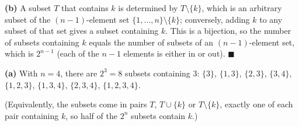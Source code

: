 \textbf{(b)} A subset $T$ that contains $k$ is determined by $T\setminus\{k\}$, which is an arbitrary subset of the $(n-1)$-element set $\{1,\ldots,n\}\setminus\{k\}$; conversely, adding $k$ to any subset of that set gives a subset containing $k$. This is a bijection, so the number of subsets containing $k$ equals the number of subsets of an $(n-1)$-element set, which is $2^{n-1}$ (each of the $n-1$ elements is either in or out). $\blacksquare$

\textbf{(a)} With $n=4$, there are $2^3=\boxed{8}$ subsets containing $3$: $\{3\}$, $\{1,3\}$, $\{2,3\}$, $\{3,4\}$, $\{1,2,3\}$, $\{1,3,4\}$, $\{2,3,4\}$, $\{1,2,3,4\}$.

(Equivalently, the subsets come in pairs $T$, $T\cup\{k\}$ or $T\setminus\{k\}$, exactly one of each pair containing $k$, so half of the $2^n$ subsets contain $k$.)
